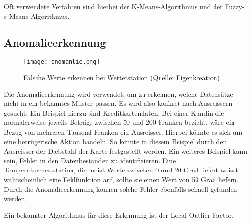 Oft verwendete Verfahren sind hierbei der K-Means-Algorithmus und der Fuzzy-c-Means-Algorithmus.

\subsection{Anomalieerkennung}
\begin{figure}[h!]
	\centering
	\texttt{[image: anomanlie.png]}
	\caption{Falsche Werte erkennen bei Wetterstation (Quelle: Eigenkreation)}
\end{figure}
Die Anomalieerkennung wird verwendet, um zu erkennen, welche Datensätze nicht in ein bekanntes Muster passen. Es wird also konkret nach Ausreissern gesucht. Ein Beispiel hierzu sind Kreditkartendaten. Bei einer Kundin die normalerweise jeweils Beträge zwischen 50 und 200 Franken bezieht, wäre ein Bezug von mehreren Tausend Franken ein Ausreisser. Hierbei könnte es sich um eine betrügerische Aktion handeln. So könnte in diesem Beispiel durch den Ausreisser der Diebstahl der Karte festgestellt werden.
Ein weiteres Beispiel kann sein, Fehler in den Datenbeständen zu identifizieren. Eine Temperaturmessstation, die meist Werte zwischen 0 und 20 Grad liefert weisst wahrscheinlich eine Fehlfunktion auf, sollte sie einen Wert von 50 Grad liefern. Durch die Anomalieerkennung können solche Fehler ebenfalls schnell gefunden werden.

Ein bekannter Algorithmus für diese Erkennung ist der Local Outlier Factor.